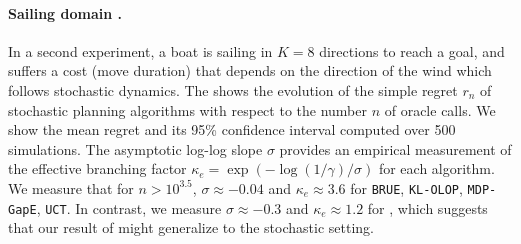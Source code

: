 \documentclass[runningheads]{llncs}
\begin{document}
\paragraph{Sailing domain \citep{Vanderbei1996}.}
In a second experiment, a boat is sailing in $K=8$ directions to reach a goal, and suffers a cost (move duration) that depends on the direction of the wind which follows stochastic dynamics. The  shows the evolution of the simple regret $r_n$ of stochastic planning algorithms with respect to the number $n$ of oracle calls. We show the mean regret and its 95\% confidence interval computed over 500 simulations. The asymptotic log-log slope $\sigma$ provides an empirical measurement of the effective branching factor $\kappa_e = \exp(-\log(1/\gamma)/\sigma)$ for each algorithm. We measure that for $n>10^{3.5}$, $\sigma \approx-0.04$ and $\kappa_e \approx 3.6$ for \texttt{BRUE}, \texttt{KL-OLOP}, \texttt{MDP-GapE}, \texttt{UCT}. In contrast, we measure $\sigma \approx-0.3$ and $\kappa_e \approx 1.2$ for \GBOP, which suggests that our result of  might generalize to the stochastic setting.
\end{document}

